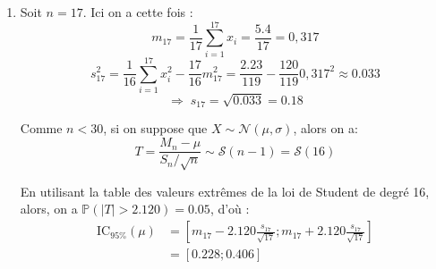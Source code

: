 \documentclass[a4paper,oneside,12pt]{article}
\theoremstyle{plain}
\newtheorem*{remark}{Remarque}
\def\P{{\mathbb P}}
\begin{document}
\begin{enumerate}
    \begin{remark}
    C'est le même principe lorsque l'on construit un intervalle de confiance pour une variable aléatoire de loi normale, à la différence prés que l'on cherche à encadrer la moyenne et non la variable aléatoire.
    \end{remark}
    
    Il y a donc 95\% de chances pour que :
    $$\mu\mbox{ soit entre } M_n-1.96\frac{S_{n}}{\sqrt{n}}\mbox{ et } M_n+1.96\frac{S_{n}}{\sqrt{n}}$$
    Si on regarde la réalisation de ces deux bornes, cela signifie que 
    $$\mbox{IC}_{95\%}(\mu) = \left[m_{120}-1.96\frac{s_{120}}{\sqrt{120}} ; m_{120}+1.96\frac{s_{120}}{\sqrt{120}}\right]$$
    et en terminant les calculs : 
    $$\mbox{IC}_{95\%}(\mu) = \left[0.282 ; 0.318\right]$$
    
    En recommençant le même raisonnement, à partir du fait que $\P\left(\left|T\right|>2.326\right) = 0.02$ (toujours d'après la table des valeurs extrêmes de la loi normale centrale réduite), on montre que :
    $$\P\left(M_n-2.326\frac{S_n}{\sqrt{n}} <\mu<M_n + 2.326\frac{S_n}{\sqrt{n}}\right) = 0.98$$
    d'où :
    \begin{align*}
        \mbox{IC}_{98\%}(\mu) &= \left[m_{120}-2.326\frac{s_{120}}{\sqrt{120}} ; m_{120}+2.326\frac{s_{120}}{\sqrt{120}}\right]\\
        &=\left[0.279 ; 0.321\right] 
    \end{align*}
    
    \item Soit $n=17$. Ici on a cette fois :
    $$m_{17}= \frac{1}{17}\sum_{i=1}^{17}x_i = \frac{5.4}{17} = 0,317$$
    $$s_{17}^2 = \frac{1}{16}\sum_{i=1}^{17}x_i^2 - \frac{17}{16}m_{17}^2 = \frac{2.23}{119}-\frac{120}{119}0,317^2 \approx 0.033$$
    $$\Rightarrow \; s_{17} = \sqrt{0.033} = 0.18$$
    
    Comme $n<30$, si on suppose que $X\sim \mathcal{N}(\mu,\sigma)$, alors on a:
    $$T = \frac{M_n - \mu}{S_{n}/\sqrt{n}} \sim \mathcal{S}\left(n-1\right) = \mathcal{S}\left(16\right)$$
    
    En utilisant la table des valeurs extrêmes de la loi de Student de degré 16, alors, on a $\P\left(\left|T\right|>2.120\right) = 0.05$, d'où :
    \begin{align*}
        \mbox{IC}_{95\%}(\mu) &= \left[m_{17}-2.120\frac{s_{17}}{\sqrt{17}} ; m_{17}+2.120\frac{s_{17}}{\sqrt{17}}\right]\\
        &=\left[0.228 ; 0.406\right] 
    \end{align*}    
    

\end{enumerate}
\end{document}
